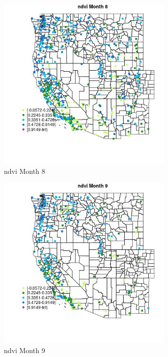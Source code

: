 \begin{figure} 
\centering  
\includegraphics[width=0.77\textwidth]{Code_Outputs/Report_ML_input_PM25_Step4_part_e_de_duplicated_aves_compiled_2019-05-18wNAs_MapObsMo8ndvi.jpg} 
\caption{\label{fig:Report_ML_input_PM25_Step4_part_e_de_duplicated_aves_compiled_2019-05-18wNAsMapObsMo8ndvi}ndvi Month 8} 
\end{figure} 
 

\begin{figure} 
\centering  
\includegraphics[width=0.77\textwidth]{Code_Outputs/Report_ML_input_PM25_Step4_part_e_de_duplicated_aves_compiled_2019-05-18wNAs_MapObsMo9ndvi.jpg} 
\caption{\label{fig:Report_ML_input_PM25_Step4_part_e_de_duplicated_aves_compiled_2019-05-18wNAsMapObsMo9ndvi}ndvi Month 9} 
\end{figure} 
 
